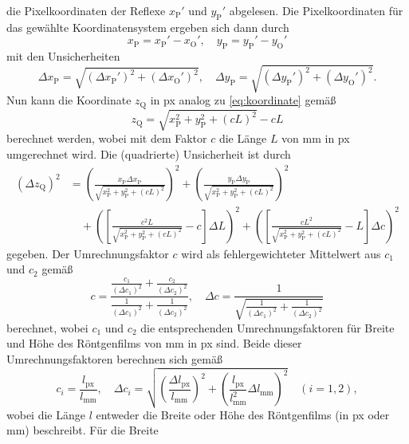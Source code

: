 die Pixelkoordinaten der Reflexe $x_{\mathrm{P}}'$ und $y_{\mathrm{P}}'$ abgelesen. Die Pixelkoordinaten für das gewählte Koordinatensystem ergeben sich dann durch
\begin{equation*}
    x_{\mathrm{P}} = x_{\mathrm{P}}' - x_{\mathrm{O}}' , \quad y_{\mathrm{P}} = y_{\mathrm{P}}' - y_{\mathrm{O}}'
\end{equation*} mit den Unsicherheiten
\begin{equation*}
    \Delta x_{\mathrm{P}} = \sqrt{(\Delta x_{\mathrm{P}}')^2 + (\Delta x_{\mathrm{O}}')^2} , \quad \Delta y_{\mathrm{P}} = \sqrt{(\Delta y_{\mathrm{P}}')^2 + (\Delta y_{\mathrm{O}}')^2} .
\end{equation*} Nun kann die Koordinate $z_{\mathrm{Q}}$ in px analog zu \cref{eq:koordinate} gemäß
\begin{equation*}
    z_{\mathrm{Q}} = \sqrt{x_{\mathrm{P}}^2 + y_{\mathrm{P}}^2 + (c L)^2} - c L
\end{equation*} berechnet werden, wobei mit dem Faktor $c$ die Länge $L$ von \unit{\milli \meter} in px umgerechnet wird. Die (quadrierte) Unsicherheit ist durch
\begin{align*}
    (\Delta z_{\mathrm{Q}})^2 &= \left(\frac{x_{\mathrm{P}} \Delta x_{\mathrm{P}}}{\sqrt{x_{\mathrm{P}}^2 + y_{\mathrm{P}}^2 + (c L)^2}}\right)^2
                                +\left(\frac{y_{\mathrm{P}} \Delta y_{\mathrm{P}}}{\sqrt{x_{\mathrm{P}}^2 + y_{\mathrm{P}}^2 + (c L)^2}}\right)^2 \\
                              &\quad+ \left(\left[\frac{c^2 L}{\sqrt{x_{\mathrm{P}}^2 + y_{\mathrm{P}}^2 + (c L)^2}} - c\right] \Delta L\right)^2
                                +\left(\left[\frac{c L^2}{\sqrt{x_{\mathrm{P}}^2 + y_{\mathrm{P}}^2 + (c L)^2}} - L\right] \Delta c\right)^2
\end{align*} gegeben. Der Umrechnungsfaktor $c$ wird als fehlergewichteter Mittelwert aus $c_1$ und $c_2$ gemäß
\begin{equation*}
    c = \frac{\frac{c_1}{(\Delta c_1)^2} + \frac{c_2}{(\Delta c_2)^2}}{\frac{1}{(\Delta c_1)^2} + \frac{1}{(\Delta c_2)^2}} , \quad
    \Delta c = \frac{1}{\sqrt{\frac{1}{(\Delta c_1)^2} + \frac{1}{(\Delta c_2)^2}}}
\end{equation*} berechnet, wobei $c_1$ und $c_2$ die entsprechenden Umrechnungsfaktoren für Breite und Höhe des Röntgenfilms von \unit{\milli \meter} in px sind.
Beide dieser Umrechnungsfaktoren berechnen sich gemäß
\begin{equation*}
    c_i = \frac{l_{\mathrm{px}}}{l_{\unit{\milli \meter}}}, \quad \Delta c_i = \sqrt{\left(\frac{\Delta l_{\mathrm{px}}}{l_{\unit{\milli \meter}}}\right)^2 + \left(\frac{l_{\mathrm{px}}}{l_{\unit{\milli \meter}}^2}\Delta l_{\unit{\milli \meter}}\right)^2} \quad (i = 1,2),
\end{equation*} wobei die Länge $l$ entweder die Breite oder Höhe des Röntgenfilms (in px oder \unit{\milli \meter}) beschreibt. Für die Breite
